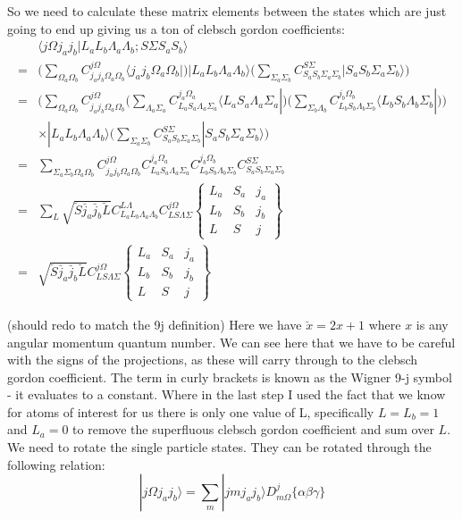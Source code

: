 \documentclass[prl, longbibliography, aps, 10pt]{revtex4-2}
\begin{document}
So we need to calculate these matrix elements between the states which are just going to end up giving us a ton of clebsch gordon coefficients: 
\begin{align}
&\langle j\Omega j_a j_b | L_a L_b \Lambda_a \Lambda_b; S\Sigma S_a S_b\rangle \\
= &\Bigg(\sum_{\Omega_a \Omega_b} C_{j_a j_b \Omega_a \Omega_b}^{j \Omega} \langle j_a j_b \Omega_a \Omega_b |\Bigg)|L_a L_b \Lambda_a \Lambda_b\rangle \Bigg(\sum_{\Sigma_a\Sigma_b} C_{S_a S_b \Sigma_a \Sigma_b}^{S \Sigma}| S_a S_b \Sigma_a \Sigma_b\rangle\Bigg)\\
=&\Bigg(\sum_{\Omega_a \Omega_b}C_{j_a j_b \Omega_a \Omega_b}^{j \Omega}\Big(\sum_{\Lambda_a\Sigma_a} C_{L_a S_a \Lambda_a \Sigma_a}^{j_a \Omega_a}\langle L_a S_a \Lambda_a \Sigma_a |\Big)\Big(\sum_{\Sigma_b\Lambda_b} C_{L_b S_b \Lambda_b \Sigma_b}^{j_b \Omega_b}\langle L_b S_b \Lambda_b \Sigma_b |\Big)\Bigg)\\
&\times|L_a L_b \Lambda_a \Lambda_b\rangle\Bigg(\sum_{\Sigma_a\Sigma_b} C_{S_a S_b \Sigma_a \Sigma_b}^{S \Sigma} | S_a S_b \Sigma_a \Sigma_b\rangle\Bigg)\\
=&\sum_{\Sigma_a \Sigma_b \Omega_a \Omega_b} 
C_{j_a j_b \Omega_a \Omega_b}^{j \Omega} 
C_{L_a S_a \Lambda_a \Sigma_a}^{j_a \Omega_a}
C_{L_b S_b \Lambda_b \Sigma_b}^{j_b \Omega_b} 
C_{S_a S_b \Sigma_a \Sigma_b}^{S \Sigma}\\
=&\sum_{L} \sqrt{\breve{S}\breve{j_a}\breve{j_b}\breve{L}} 
C_{L_a L_b \Lambda_a \Lambda_b}^{L \Lambda}
C_{L S \Lambda \Sigma}^{j \Omega}
\begin{Bmatrix}
L_a & S_a & j_a\\
L_b & S_b & j_b\\
L & S & j
\end{Bmatrix}\\
=&\sqrt{\breve{S}\breve{j_a}\breve{j_b}\breve{L}} 
C_{L S \Lambda \Sigma}^{j \Omega}
\begin{Bmatrix}
L_a & S_a & j_a\\
L_b & S_b & j_b\\
L & S & j
\end{Bmatrix}
\end{align}

(should redo to match the 9j definition) Here we have $\breve{x}=2x+1$ where $x$ is any angular momentum quantum number. We can see here that we have to be careful with the signs of the projections, as these will carry through to the clebsch gordon coefficient.  The term in curly brackets is known as the Wigner 9-j symbol - it evaluates to a constant. Where in the last step I used the fact that we know for atoms of interest for us there is only one value of L, specifically $L=L_b=1$ and $L_a=0$ to remove the superfluous clebsch gordon coefficient and sum over $L$. We need to rotate the single particle states. They can be rotated through the following relation:
\begin{equation}
|j\Omega j_a j_b\rangle = \sum_m |j m j_a j_b\rangle D^j_{m \Omega}\{\alpha\beta\gamma\}
\end{equation}
\end{document}
